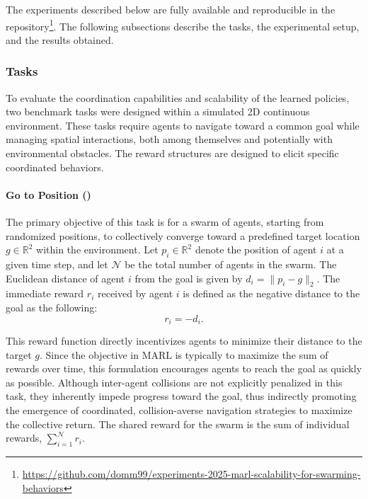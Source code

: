 The experiments described below are fully available and reproducible in the 
 repository\footnote{\url{https://github.com/domm99/experiments-2025-marl-scalability-for-swarming-behaviors}}.
%
The following subsections describe the tasks, the experimental setup, and the results obtained.


\subsubsection{Tasks}\label{sec:Tasks}
To evaluate the coordination capabilities and scalability of the learned policies, 
 two benchmark tasks were designed within a simulated 2D continuous environment.
%
These tasks require agents to navigate toward a common goal while managing spatial interactions, 
 both among themselves and potentially with environmental obstacles. 
%
The reward structures are designed to elicit specific coordinated behaviors.

\paragraph{Go to Position ()}
The primary objective of this task
 is for a swarm of agents, 
 starting from randomized positions, 
 to collectively converge toward a predefined target location \( g \in \mathbb{R}^2 \) 
 within the environment.
%
Let \( p_i \in \mathbb{R}^2 \) denote the position of agent \( i \) at a given time step, 
 and let \( \mathcal{N} \) be the total number of agents in the swarm. 
%
The Euclidean distance of agent \( i \) from the goal is given by \( d_i = \|p_i - g\|_2 \).
%
The immediate reward \( r_i \) received by agent \( i \) is defined as the negative distance to the goal as the following:
{\begin{equation}
r_i = - d_i.
\end{equation}}

This reward function directly incentivizes agents to minimize their distance to the target \(g\). 
% 
Since the objective in \gls{MARL} is typically to maximize the sum of rewards over time, 
 this formulation encourages agents to reach the goal as quickly as possible.
%
Although inter-agent collisions are not explicitly penalized in this task, 
 they inherently impede progress toward the goal, 
 thus indirectly promoting the emergence of coordinated, 
 collision-averse navigation strategies to maximize the collective return. 
%  
The shared reward for the swarm is the sum of individual rewards, 
  \(\sum_{i=1}^{\mathcal{N}} r_i\).
  
